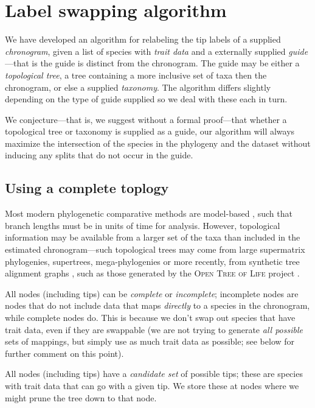 \documentclass[a4paper,11pt]{article}
\begin{document}
\section{Label swapping algorithm}

We have developed an algorithm for relabeling the tip labels of a supplied \emph{chronogram}, given a list of species with \emph{trait data} and a externally supplied \emph{guide}---that is the guide is distinct from the chronogram. The guide may be either a \emph{topological tree}, a tree containing a more inclusive set of taxa then the chronogram, or else a supplied \emph{taxonomy}. The algorithm differs slightly depending on the type of guide supplied so we deal with these each in turn.

We conjecture---that is, we suggest without a formal proof---that whether a topological tree or taxonomy is supplied as a guide, our algorithm will always maximize the intersection of the species in the phylogeny and the dataset without inducing any splits that do not occur in the guide.

\subsection{Using a complete toplogy}

Most modern phylogenetic comparative methods are model-based \citep[recently reviewed by][]{PennellHarmon}, such that branch lengths must be in units of time for analysis. However, topological information may be available from a larger set of the taxa than included in the estimated chronogram---such topological trees may come from large supermatrix phylogenies, supertrees, mega-phylogenies \citep[\emph{sensu}][]{Smithmega} or more recently, from synthetic tree alignment graphs \citep{Smith2013}, such as those generated by the \textsc{Open Tree of Life} project \citep{OpenTree}.

All nodes (including tips) can be \emph{complete} or \emph{incomplete}; incomplete nodes are nodes that do not include data that maps \emph{directly} to a species in the chronogram, while complete nodes do.  This is because we don't swap out species that have trait data, even if they are swappable (we are not trying to generate \emph{all possible} sets of mappings, but simply use as much trait data as possible; see below for further comment on this point).

All nodes (including tips) have a \emph{candidate set} of possible tips; these are species with trait data that can go with a given tip.  We store these at nodes where we might prune the tree down to that node.
\end{document}
